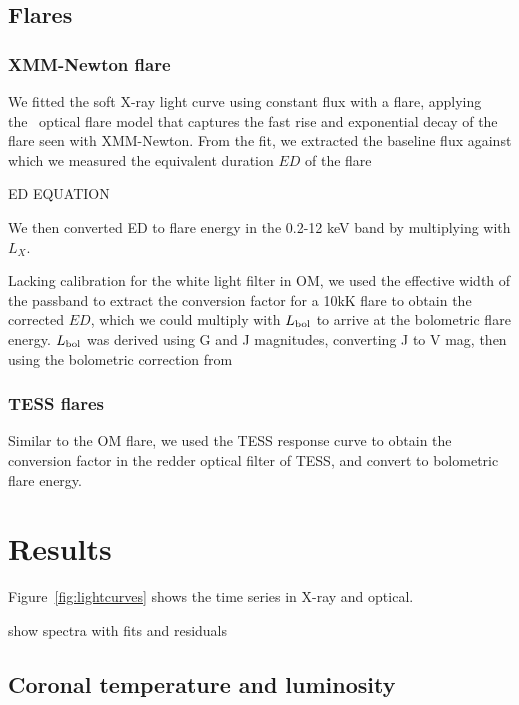 \documentclass[twocolumn]{aastex631}
\begin{document}
\subsection{Flares}

\subsubsection{XMM-Newton flare}

We fitted the soft X-ray light curve using constant flux with a flare, applying the~\citet{davenport2014kepler} optical flare model that captures the fast rise and exponential decay of the flare seen with XMM-Newton. From the fit, we extracted the baseline flux against which we measured the equivalent duration $ED$ of the flare

ED EQUATION

We then converted ED to flare energy in the 0.2-12 keV band by multiplying with $L_X$. 

Lacking calibration for the white light filter in OM, we used the effective width of the passband to extract the conversion factor for a 10kK flare to obtain the corrected $ED$, which we could multiply with $L_{\rm bol}$ to arrive at the bolometric flare energy. $L_{\rm bol}$ was derived using G and J magnitudes, converting J to V mag, then using the bolometric correction from
\subsubsection{TESS flares}

Similar to the OM flare, we used the TESS response curve to obtain the conversion factor in the redder optical filter of TESS, and convert to bolometric flare energy.


\section{Results}

Figure~\ref{fig:lightcurves} shows the time series in X-ray and optical. 



show spectra with fits and residuals


\subsection{Coronal temperature and luminosity}

\end{document}
